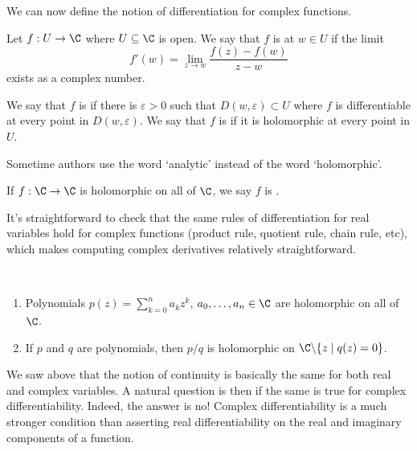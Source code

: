 We can now define the notion of differentiation for complex functions.

\begin{definition}
    Let $f: U \rightarrow \C$ where $U \subseteq \C$ is open.   
    We say that $f$ is  at $w \in U$ if the limit
    $$
    f'(w) = \lim_{z \to w} \frac{f(z) - f(w)}{z - w}
    $$
    exists as a complex number.
\end{definition}
\begin{definition}[Holomorphic]
    We say that $f$ is  if there is $\varepsilon > 0$ such that $D(w, \varepsilon) \subset U$ where $f$ is differentiable at every point in $D(w, \varepsilon)$. We say that $f$ is  if it is holomorphic at every point in $U$.
\end{definition}

\begin{remark}
    Sometime authors use the word `analytic' instead of the word `holomorphic'.
\end{remark}

\begin{definition}[Entire]
    If $f: \C \rightarrow \C$ is holomorphic on all of $\C$, we say $f$ is .
\end{definition}



It's straightforward to check that the same rules of differentiation for real variables hold for complex functions (product rule, quotient rule, chain rule, etc), which makes computing complex derivatives relatively straightforward.

\begin{example}~
    \vspace*{-1.5\baselineskip}
\begin{enumerate}[label=(\roman*)]
    \item Polynomials $p(z) = \sum_{k = 0}^n a_k z^k$, $a_0, \dots, a_n \in \C$ are holomorphic on all of $\C$.
    \item If $p$ and $q$ are polynomials, then $p/q$ is holomorphic on $\C \backslash \{z \mid q(z) = 0\}$.
\end{enumerate}
\end{example}
    
We saw above that the notion of continuity is basically the same for both real and complex variables. A natural question is then if the same is true for complex differentiability.
Indeed, the answer is no! Complex differentiability is a much stronger condition than asserting real differentiability on the real and imaginary components of a function.

